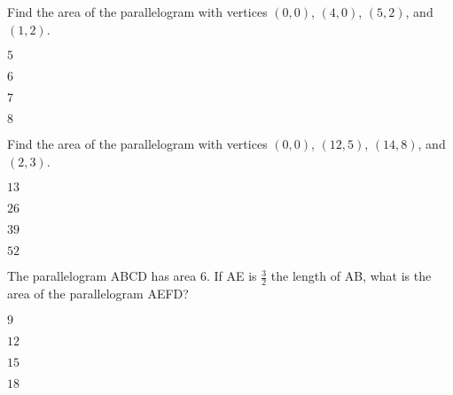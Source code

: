 \documentclass{article}
\begin{document}
\begin{readinessAssuranceTest}

\item Find the area of the parallelogram with vertices $(0,0)$, $(4,0)$, $(5,2)$, and $(1,2)$.
\begin{multicols}{2}
\begin{readinessAssuranceTestChoices}
\item $5$
\item $6$
\item $7$
\item $8$
\end{readinessAssuranceTestChoices}


\end{multicols}

\item Find the area of the parallelogram with vertices $(0,0)$, $(12,5)$, $(14,8)$, and $(2,3)$.
\begin{multicols}{2}
\begin{readinessAssuranceTestChoices}
\item $13$
\item $26$
\item $39$
\item $52$
\end{readinessAssuranceTestChoices}


\end{multicols}

\item The parallelogram ABCD has area $6$.  If AE is $\frac{3}{2}$ the length of AB, what is the area of the parallelogram AEFD?
\begin{multicols}{2}
\begin{readinessAssuranceTestChoices}
\item $9$
\item $12$
\item $15$
\item $18$
\end{readinessAssuranceTestChoices}


\end{multicols}
\end{readinessAssuranceTest}
\end{document}
